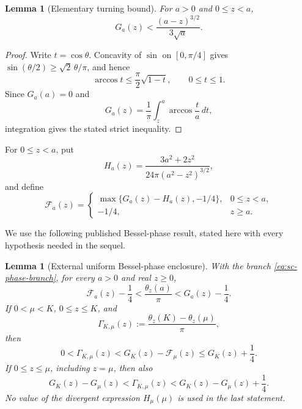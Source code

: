 \documentclass[11pt]{article}
\numberwithin{equation}{section}
\newtheorem{lemma}[theorem]{Lemma}
\theoremstyle{definition}
\theoremstyle{remark}
\begin{document}
\begin{lemma}[Elementary turning bound]
\label{lem:sc-turning-bound}
For \(a>0\) and \(0\leq z<a\),
\begin{equation}
  G_a(z)<\frac{(a-z)^{3/2}}{3\sqrt a}.
  \label{eq:sc-turning-point-bound}
\end{equation}
\end{lemma}

\begin{proof}
Write \(t=\cos\theta\).  Concavity of \(\sin\) on
\([0,\pi/4]\) gives
\(\sin(\theta/2)\geq\sqrt2\,\theta/\pi\), and hence
\[
  \arccos t\leq\frac\pi2\sqrt{1-t},
  \qquad 0\leq t\leq1.
\]
Since \(G_a(a)=0\) and
\[
  G_a(z)=\frac1\pi\int_z^a\arccos\frac ta\,dt,
\]
integration gives the stated strict inequality.
\end{proof}

For \(0\le z<a\), put
\[
  H_a(z)=\frac{3a^2+2z^2}{24\pi(a^2-z^2)^{3/2}},
\]
and define
\begin{equation}
  \mathcal F_a(z)=
  \begin{cases}
  \max\{G_a(z)-H_a(z),-1/4\},&0\le z<a,\\
  -1/4,&z\ge a.
  \end{cases}
  \label{eq:sc-auxiliary-F}
\end{equation}

We use the following published Bessel-phase result, stated here with every
hypothesis needed in the sequel.

\begin{lemma}[External uniform Bessel-phase enclosure]
\label{lem:sc-external-phase}
With the branch \eqref{eq:sc-phase-branch}, for every \(a>0\) and real
\(z\ge0\),
\begin{equation}
  \mathcal F_a(z)-\frac14
  <\frac{\theta_z(a)}\pi
  <G_a(z)-\frac14.
  \label{eq:sc-individual-phase-enclosure}
\end{equation}
If \(0<\mu<K\), \(0\le z\le K\), and
\[
  \Gamma_{K,\mu}(z)
  :=\frac{\theta_z(K)-\theta_z(\mu)}\pi,
\]
then
\begin{equation}
  0<\Gamma_{K,\mu}(z)
  <G_K(z)-\mathcal F_\mu(z)
  \le G_K(z)+\frac14.
  \label{eq:sc-global-difference-enclosure}
\end{equation}
If \(0\le z\le\mu\), including \(z=\mu\), then also
\begin{equation}
  G_K(z)-G_\mu(z)
  <\Gamma_{K,\mu}(z)
  <G_K(z)-G_\mu(z)+\frac14.
  \label{eq:sc-action-difference-enclosure}
\end{equation}
No value of the divergent expression \(H_\mu(\mu)\) is used in the last
statement.
\end{lemma}
\end{document}
